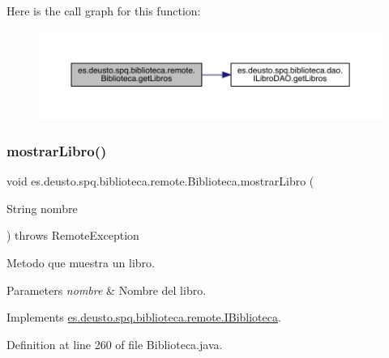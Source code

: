 Here is the call graph for this function\+:
\nopagebreak
\begin{figure}[H]
\begin{center}
\leavevmode
\includegraphics[width=350pt]{classes_1_1deusto_1_1spq_1_1biblioteca_1_1remote_1_1_biblioteca_a9af87498dad047e3b371f17b3d29bcff_cgraph}
\end{center}
\end{figure}
\mbox{\label{classes_1_1deusto_1_1spq_1_1biblioteca_1_1remote_1_1_biblioteca_a6455f223a57806146e77149429caf6db}} 
\subsubsection{\texorpdfstring{mostrar\+Libro()}{mostrarLibro()}}
{\footnotesize\ttfamily void es.\+deusto.\+spq.\+biblioteca.\+remote.\+Biblioteca.\+mostrar\+Libro (\begin{DoxyParamCaption}\item[{String}]{nombre }\end{DoxyParamCaption}) throws Remote\+Exception}

Metodo que muestra un libro. 
\begin{DoxyParams}{Parameters}
{\em nombre} & Nombre del libro. \\
\hline
\end{DoxyParams}


Implements \mbox{\hyperlink{interfacees_1_1deusto_1_1spq_1_1biblioteca_1_1remote_1_1_i_biblioteca_a9a4d21325f41bc582e7e792e0ae40857}{es.\+deusto.\+spq.\+biblioteca.\+remote.\+I\+Biblioteca}}.



Definition at line 260 of file Biblioteca.\+java.

